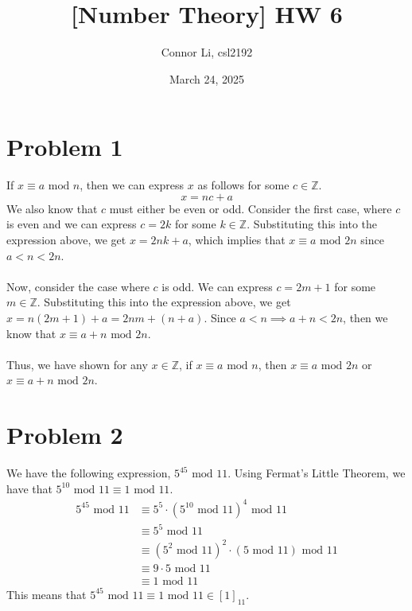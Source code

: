 \documentclass[8pt]{extarticle}
\title{[Number Theory] HW 6}
\author{Connor Li, csl2192}
\date{March 24, 2025}
\begin{document}
\maketitle

\section*{Problem 1}
If $x \equiv a \text{ mod }n$, then we can express $x$ as follows for some $c \in \mathbb{Z}$.
$$
x = nc + a
$$
We also know that $c$ must either be even or odd. Consider the first case, where $c$ is even and we can express $c = 2k$ for some $k \in \mathbb{Z}$. Substituting this into the expression above, we get $x = 2nk + a$, which implies that $x \equiv a \text{ mod }2n$ since $a < n < 2n$. \\
\\
Now, consider the case where $c$ is odd. We can express $c = 2m + 1$ for some $m \in \mathbb{Z}$. Substituting this into the expression above, we get $x = n(2m + 1) + a = 2nm + (n + a)$. Since $a < n \implies a + n < 2n$, then we know that $x \equiv a + n \text{ mod } 2n$. \\
\\
Thus, we have shown for any $x \in \mathbb{Z}$, if $x \equiv a \text{ mod }n$, then $x \equiv a \text{ mod }2n$ or $x \equiv a + n \text{ mod }2n$.



\pagebreak
\section*{Problem 2}
We have the following expression, $5^{45} \text{ mod }11$. Using Fermat's Little Theorem, we have that $5^{10} \text{ mod }11 \equiv 1 \text{ mod }11$.
\begin{align*}
    5^{45} \text{ mod }11 &\equiv 5^5 \cdot \left(5^{10} \text{ mod }11\right)^4 \text{ mod }11\\ 
    &\equiv 5^5 \text{ mod }11 \\
    &\equiv (5^2 \text{ mod }11)^2 \cdot (5 \text{ mod }11) \text{ mod }11\\
    &\equiv 9 \cdot 5 \text{ mod }11\\
    &\equiv 1 \text{ mod }11
\end{align*}
This means that $5^{45} \text{ mod }11 \equiv 1 \text{ mod }11 \in [1]_{11}$.



\pagebreak
\end{document}
